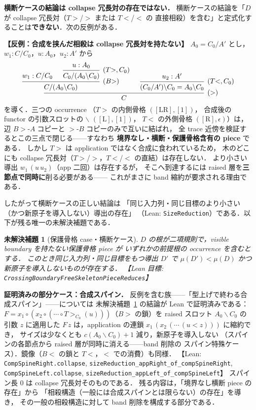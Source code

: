 \documentclass[paper=a4,fontsize=10pt,jafontscale=0.92]{jlreq}
\theoremstyle{plain}
\newtheorem{conjecture}[theorem]{未解決補題}
\theoremstyle{definition}
\theoremstyle{remark}
\newcommand{\bs}{\backslash}
\newcommand{\lean}[1]{\texttt{#1}}
\begin{document}
\medskip
\noindent\textbf{横断ケースの結論は collapse 冗長対の存在ではない．}
横断ケースの結論を「$D$ が collapse 冗長対（$T{>}$/$>$ または $T{<}$/$<$ の
直接相殺）を含む」と定式化することは\textbf{できない}．次の反例がある．

\begin{verifybox}
\textbf{【反例：合成を挟んだ相殺は collapse 冗長対を持たない】}
$A_0 = C_0/A'$ とし，$w_1 : C/C_0$，$u : A_0$，$u_2 : A'$ から
\[
\begin{prooftree}
  \hypo{w_1 : C/C_0}
  \hypo{u : A_0}
  \infer1[$(T{>},C_0)$]{C_0/(A_0\bs C_0)}
  \infer2[$(B{>})$]{C/(A_0\bs C_0)}
  \hypo{u_2 : A'}
  \infer1[$(T{<},C_0)$]{(C_0/A')\bs C_0 = A_0\bs C_0}
  \infer2[$(>)$]{C}
\end{prooftree}
\]
を導く．三つの occurrence
（$T{>}$ の内側骨格 $([\mathrm{LR}],[1])$，
合成後の functor の引数スロットの $\bs$ $([\mathrm{L}],[1])$，
$T{<}$ の外側骨格 $([\mathrm{R}],\epsilon)$）は，
辺 $B{>}$-$A$ コピーと $>$-$B$ コピーのみで互いに結ばれ，
全 trace 近傍を検証するとこの三点で閉じる——すなわち
\textbf{境界なし・横断・保護骨格含有の piece} である．
しかし $T{>}$ は application ではなく合成に食われているため，
木のどこにも collapse 冗長対（$T{>}$/$>$，$T{<}$/$<$ の直結）は存在しない．
より小さい導出 $w_1\,(u\,u_2)$（app 二回）は存在するが，
そこへ到達するには raised 層を\textbf{三節点で同時に}削る必要がある——
これがまさに band 縮約が要求される理由である．
\end{verifybox}

したがって横断ケースの正しい結論は
「同じ入力列・同じ目標のより小さい（かつ新原子を導入しない）導出の存在」
（Lean: \lean{SizeReduction}）である．以下が残る唯一の未解決補題である．

\begin{conjecture}[保護骨格 case・横断ケース]
\label{conj:protected}
$D$ の根が二項規則で，visible boundary を持たない保護骨格 piece が
いずれかの前提根の occurrence を含むとする．
このとき同じ入力列・同じ目標をもつ導出 $D'$ で
$\mu(D') < \mu(D)$ かつ新原子を導入しないものが存在する．
【Lean 目標: \lean{CrossingBoundaryFreeSkeletonPieceReduces}】
\end{conjecture}

\medskip
\noindent\textbf{証明済みの部分ケース：合成スパイン．}
反例を含む族——「型上げで終わる合成スパイン」——については
未解決補題~\ref{conj:protected} の結論が Lean で証明済みである：
$F = x_1 \circ (x_2 \circ (\cdots \circ T{>}_{C_0}(u)))$（$B{>}$ の鎖）を
raised スロット $A_0\bs C_0$ の引数 $z$ に適用した
$F\,z$ は，application の連鎖
$x_1\,(x_2\,(\cdots\,(u \mathbin{<} z)))$ に縮約でき，
サイズは少なくとも $c(A_0\bs C_0)+1$ 減り，新原子を導入しない
（スパインの各節点から raised 層が同時に消える——band 削除の
スパイン特殊ケース）．鏡像（$B{<}$ の鎖と $T{<}$，$<$ での消費）も同様．
【Lean: \lean{CompSpineRight.collapse},
\lean{sizeReduction\_appRight\_of\_compSpineRight},
\lean{CompSpineLeft.collapse},
\lean{sizeReduction\_appLeft\_of\_compSpineLeft}】
スパイン長 $0$ は collapse 冗長対そのものである．
残る内容は，「境界なし横断 piece の存在」から
「相殺構造（一般には合成スパインとは限らない）の存在」を導き，
その一般の相殺構造に対して band 削除を構成する部分である．
\end{document}
